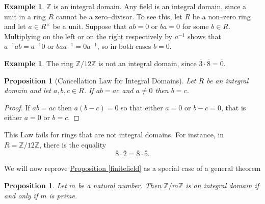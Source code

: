 \documentclass[11pt]{amsbook}
\newtheorem{proposition}[theorem]{Proposition}
\theoremstyle{definition}
\newtheorem{ex}[theorem]{Example}
\begin{document}
\begin{ex} \label{unitnz} $\mathbb{Z}$ is an integral domain. Any field is an integral domain, since a unit in a ring $R$ cannot be a zero--divisor. To see this, let $R$ be a non--zero ring and let $a\in R^{\times}$ be a unit. Suppose that $ab = 0$ or $ba = 0$ for some $b\in R$. Multiplying
on the left or on the right respectively by $a^{-1}$ shows that
$a^{-1}a b = a^{-1} 0$ or $baa^{-1} = 0 a^{-1}$, so in both cases
$b = 0$. \end{ex}

\begin{ex} The ring $\mathbb{Z}/12\mathbb{Z}$ is not an integral domain, since $\overline{3}\cdot \overline{8} = \overline{0}.$
\end{ex}

\begin{proposition}[Cancellation Law for Integral Domains] \label{cancid} Let $R$ be an integral domain and let $a,b,c\in R$. If $ab=ac$ and $a\neq 0 $ then $b=c$. \end{proposition}

\begin{proof} If $ab = ac$ then $a(b-c) = 0$ so that either $a=0$ or $b-c = 0$, that is either $a=0$ or $b=c$. \end{proof}

This Law fails for rings that are not integral domains. For instance, in $R = \mathbb{Z}/12\mathbb{Z}$, there is the equality $$ \overline{8}\cdot \overline{2} = \overline{8}\cdot \overline{5}.$$

\medskip

We will now reprove \hyperref[finitefield]{Proposition \ref{finitefield}} as a special case of a general theorem

\begin{proposition}
Let $m$ be a natural number. Then $\mathbb{Z}/m\mathbb{Z}$ is an integral domain if and only if $m$ is prime.
\end{proposition}
\end{document}
